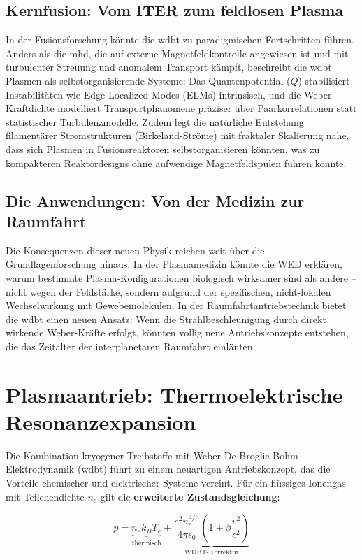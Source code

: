 \subsection{Kernfusion: Vom ITER zum feldlosen Plasma}
In der Fusionsforschung könnte die \gls{wdbt} zu paradigmischen Fortschritten führen. Anders als die \gls{mhd}, die auf externe Magnetfeldkontrolle angewiesen ist und mit turbulenter Streuung und
anomalem Transport kämpft, beschreibt die \gls{wdbt} Plasmen als selbstorganisierende Systeme: Das Quantenpotential ($Q$) stabilisiert Instabilitäten wie Edge-Localized Modes (ELMs) intrinsisch,
und die Weber-Kraftdichte modelliert Transportphänomene präziser über Paarkorrelationen statt statistischer Turbulenzmodelle. Zudem legt die natürliche Entstehung filamentärer Stromstrukturen (Birkeland-Ströme)
mit fraktaler Skalierung nahe, dass sich Plasmen in Fusionsreaktoren selbstorganisieren könnten, was zu kompakteren Reaktordesigns ohne aufwendige Magnetfeldspulen führen könnte.

\subsection{Die Anwendungen: Von der Medizin zur Raumfahrt}
Die Konsequenzen dieser neuen Physik reichen weit über die Grundlagenforschung hinaus. In der Plasmamedizin könnte die WED erklären, warum bestimmte Plasma-Konfigurationen biologisch wirksamer sind
als andere – nicht wegen der Feldstärke, sondern aufgrund der spezifischen, nicht-lokalen Wechselwirkung mit Gewebemolekülen. In der Raumfahrtantriebstechnik bietet die \gls{wdbt} einen neuen Ansatz:
Wenn die Strahlbeschleunigung durch direkt wirkende Weber-Kräfte erfolgt, könnten vollig neue Antriebskonzepte entstehen, die das Zeitalter der interplanetaren Raumfahrt einläuten.

\section{Plasmaantrieb: Thermoelektrische Resonanzexpansion}
\label{sec:hybrid_antrieb}

Die Kombination kryogener Treibstoffe mit Weber-De-Broglie-Bohm-Elektrodynamik (\gls{wdbt}) führt zu einem neuartigen Antriebskonzept, das die Vorteile chemischer und elektrischer Systeme vereint.
Für ein flüssiges Ionengas mit Teilchendichte $n_e$ gilt die \textbf{erweiterte Zustandsgleichung}:

\begin{equation}
p = \underbrace{n_e k_B T_e}_{\text{thermisch}} 
+ \underbrace{\frac{e^2 n_e^{4/3}}{4\pi \epsilon_0} \left(1 + \beta \frac{v^2}{c^2}\right)}_{\text{WDBT-Korrektur}}
\label{eq:druck}
\end{equation}

